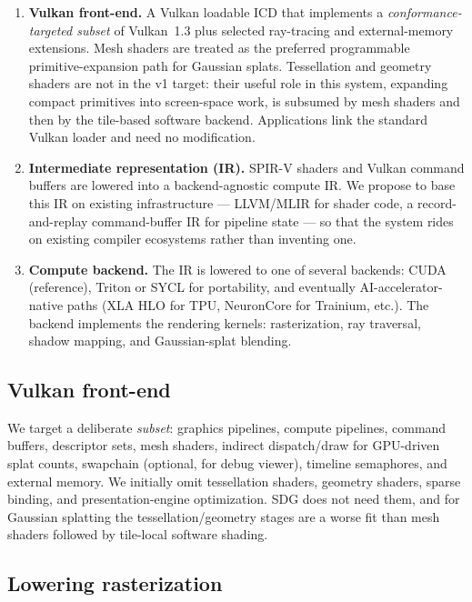 \documentclass[10pt,journal]{IEEEtran}
\begin{document}
\begin{enumerate}
    \item \textbf{Vulkan front-end.} A Vulkan loadable ICD that
    implements a \emph{conformance-targeted subset} of Vulkan~1.3 plus
    selected ray-tracing and external-memory extensions. Mesh shaders
    are treated as the preferred programmable primitive-expansion path
    for Gaussian splats. Tessellation and geometry shaders are not in
    the v1 target: their useful role in this system, expanding compact
    primitives into screen-space work, is subsumed by mesh shaders and
    then by the tile-based software backend. Applications link the
    standard Vulkan loader and need no modification.

    \item \textbf{Intermediate representation (IR).} SPIR-V shaders and
    Vulkan command buffers are lowered into a backend-agnostic compute
    IR. We propose to base this IR on existing infrastructure ---
    LLVM\slash MLIR for shader code, a record-and-replay command-buffer
    IR for pipeline state --- so that the system rides on existing
    compiler ecosystems rather than inventing one.

    \item \textbf{Compute backend.} The IR is lowered to one of several
    backends: CUDA (reference), Triton or SYCL for portability, and
    eventually AI-accelerator-native paths (XLA HLO for TPU, NeuronCore
    for Trainium, etc.). The backend implements the rendering kernels:
    rasterization, ray traversal, shadow mapping, and
    Gaussian-splat blending.
\end{enumerate}

\subsection{Vulkan front-end}

We target a deliberate \emph{subset}: graphics pipelines, compute
pipelines, command buffers, descriptor sets, mesh shaders, indirect
dispatch/draw for GPU-driven splat counts, swapchain (optional, for
debug viewer), timeline semaphores, and external memory. We initially
omit tessellation shaders, geometry shaders, sparse binding, and
presentation-engine optimization. SDG does not need them, and for
Gaussian splatting the tessellation/geometry stages are a worse fit
than mesh shaders followed by tile-local software shading.

\subsection{Lowering rasterization}
\end{document}
